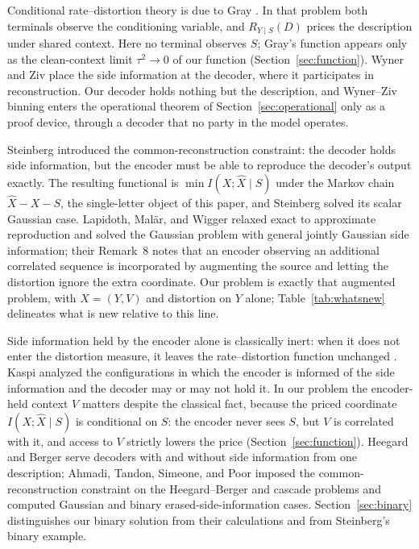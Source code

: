 \documentclass[11pt,onecolumn]{IEEEtran}
\newcommand{\hX}{\widehat{X}}
\begin{document}
Conditional rate--distortion theory is due to Gray
\cite{gray1972tr,gray1973}. In that problem both terminals observe the
conditioning variable, and $R_{Y\mid S}(D)$ prices the description under
shared context. Here no terminal observes $S$; Gray's function appears
only as the clean-context limit $\tau^2\to0$ of our function
(Section~\ref{sec:function}). Wyner and Ziv \cite{wynerziv1976} place
the side information at the decoder, where it participates in
reconstruction. Our decoder holds nothing but the description, and
Wyner--Ziv binning enters the operational theorem of
Section~\ref{sec:operational} only as a proof device, through a decoder
that no party in the model operates.

Steinberg \cite{steinberg2009} introduced the common-reconstruction
constraint: the decoder holds side information, but the encoder must be
able to reproduce the decoder's output exactly. The resulting
functional is $\min I(X;\hX\mid S)$ under the Markov chain
$\hX-X-S$, the single-letter object of this paper, and Steinberg
solved its scalar Gaussian case. Lapidoth, Mal\"ar, and Wigger
\cite{lapidoth2014} relaxed exact to approximate reproduction and
solved the Gaussian problem with general jointly Gaussian side
information; their Remark~8 notes that an encoder observing an
additional correlated sequence is incorporated by augmenting the
source and letting the distortion ignore the extra coordinate. Our
problem is exactly that augmented problem, with $X=(Y,V)$ and
distortion on $Y$ alone; Table~\ref{tab:whatsnew} delineates what is
new relative to this line.

Side information held by the encoder alone is classically inert:
when it does not enter the distortion measure, it leaves the
rate--distortion function unchanged \cite{berger1971}. Kaspi
\cite{kaspi1994} analyzed the configurations in which the encoder is
informed of the side information and the decoder may or may not hold
it. In our problem the encoder-held context $V$ matters despite the
classical fact, because the priced coordinate $I(X;\hX\mid S)$ is
conditional on $S$: the encoder never sees $S$, but $V$ is correlated
with it, and access to $V$ strictly lowers the price
(Section~\ref{sec:function}). Heegard and Berger
\cite{heegardberger1985} serve decoders with and without side
information from one description; Ahmadi, Tandon, Simeone, and Poor
\cite{ahmadi2013} imposed the common-reconstruction constraint on the
Heegard--Berger and cascade problems and computed Gaussian and binary
erased-side-information cases. Section~\ref{sec:binary} distinguishes our
binary solution from their calculations and from Steinberg's binary
example.
\end{document}
